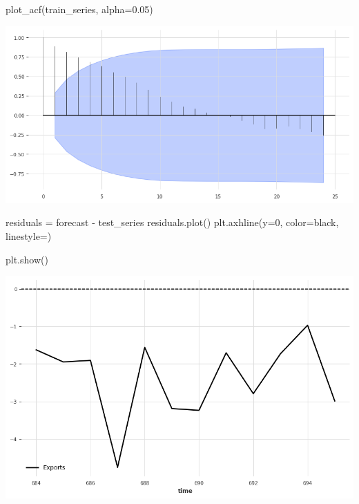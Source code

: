 \documentclass[
  11pt,
]{article}
\newenvironment{Shaded}{\begin{snugshade}}{\end{snugshade}}
\newcommand{\DecValTok}[1]{\textcolor[rgb]{0.68,0.00,0.00}{#1}}
\newcommand{\FloatTok}[1]{\textcolor[rgb]{0.68,0.00,0.00}{#1}}
\newcommand{\NormalTok}[1]{\textcolor[rgb]{0.00,0.23,0.31}{#1}}
\newcommand{\OperatorTok}[1]{\textcolor[rgb]{0.37,0.37,0.37}{#1}}
\newcommand{\StringTok}[1]{\textcolor[rgb]{0.13,0.47,0.30}{#1}}
\begin{document}
\begin{Shaded}
\begin{Highlighting}[]
\NormalTok{plot\_acf(train\_series, alpha}\OperatorTok{=}\FloatTok{0.05}\NormalTok{)}
\end{Highlighting}
\end{Shaded}

\includegraphics{hw3_files/figure-pdf/cell-46-output-1.png}

\begin{Shaded}
\begin{Highlighting}[]
\NormalTok{residuals }\OperatorTok{=}\NormalTok{ forecast }\OperatorTok{{-}}\NormalTok{ test\_series}
\NormalTok{residuals.plot()}
\NormalTok{plt.axhline(y}\OperatorTok{=}\DecValTok{0}\NormalTok{, color}\OperatorTok{=}\StringTok{\textquotesingle{}black\textquotesingle{}}\NormalTok{, linestyle}\OperatorTok{=}\StringTok{\textquotesingle{}{-}{-}\textquotesingle{}}\NormalTok{)}

\NormalTok{plt.show()}
\end{Highlighting}
\end{Shaded}

\includegraphics{hw3_files/figure-pdf/cell-47-output-1.png}
\end{document}
